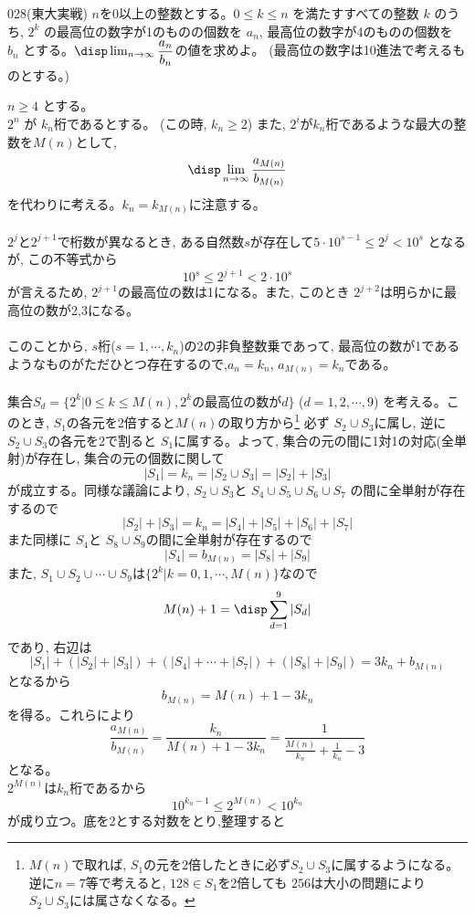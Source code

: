 \begin{prob}{028}{}{(東大実戦)}
 $n$を0以上の整数とする。$0\leq k\leq n$ を満たすすべての整数 $k$ のうち, $2^k$ の最高位の数字が1のものの個数を $a_n$, 最高位の数字が4のものの個数を $b_n$ とする。$\disp\lim_{n\to \infty} \dfrac{a_n}{b_n}$の値を求めよ。 (最高位の数字は10進法で考えるものとする。)
\end{prob}
$n\geq 4$ とする。\\
$2^n$ が $k_n$桁であるとする。 (この時, $k_n\geq 2$) また,  $2^i$が$k_n$桁であるような最大の整数を$M(n)$として,
\[\disp\lim_{n\to \infty} \dfrac{a_{M(n)}}{b_{M(n)}}\]
を代わりに考える。$k_n=k_{M(n)}$に注意する。
\\
\\
$2^{j}$と$2^{j+1}$で桁数が異なるとき, ある自然数$s$が存在して$5\cdot 10^{s-1}\leq 2^j< 10^{s}$ となるが, この不等式から
\[10^{s}\leq 2^{j+1}< 2\cdot 10^{s}\] 
が言えるため, $2^{j+1}$の最高位の数は1になる。また, このとき $2^{j+2}$は明らかに最高位の数が2,3になる。\\
\\
このことから, $s$桁($s=1,\cdots, k_n$)の2の非負整数乗であって, 最高位の数が1であるようなものがただひとつ存在するので,$a_n=k_n$,  $a_{M(n)}=k_{n}$である。\\
\\
集合$S_d=\{ 2^{k} | 0\leq k\leq M(n), 2^k\mbox{の最高位の数が$d$}\}$  ($d=1,2,\cdots ,9$) を考える。このとき, $S_1$の各元を2倍すると$M(n)$の取り方から\footnote{$M(n)$で取れば, $S_1$の元を2倍したときに必ず$S_2\cup S_3$に属するようになる。逆に$n=7$等で考えると, $128\in S_1$を2倍しても $256$は大小の問題により $S_2\cup S_3$には属さなくなる。}
必ず $S_2\cup S_3$に属し, 逆に $S_2\cup S_3$の各元を2で割ると $S_1$に属する。よって, 集合の元の間に1対1の対応(全単射)が存在し, 集合の元の個数に関して
\[|S_1|=k_n=|S_2\cup S_3|=|S_2|+|S_3|\]
が成立する。同様な議論により, $S_2\cup S_3$と $S_4\cup S_5\cup S_6 \cup S_7$ の間に全単射が存在するので
\[|S_2|+|S_3|=k_n=|S_4|+|S_5|+|S_6|+|S_7|\]
また同様に $S_4$と $S_8\cup S_9$の間に全単射が存在するので
\[|S_4|=b_{M(n)}=|S_8|+|S_9|\]
また, $S_1\cup S_2\cup \cdots \cup S_9$は$\{2^{k}| k=0,1,\cdots , M(n)\}$なので
\[M(n)+1=\disp\sum_{d=1}^9 |S_d|\]
であり, 右辺は
\[|S_1| +(|S_2|+|S_3|)+(|S_4|+\cdots +|S_7|) +(|S_8|+|S_9|)=3k_n+b_{M(n)}\]
となるから 
\[b_{M(n)}=M(n)+1-3k_{n}\]
を得る。これらにより
\[\dfrac{a_{M(n)}}{b_{M(n)}}=\dfrac{k_n}{M(n)+1-3k_{n}}=\dfrac{1}{\frac{M(n)}{k_n} +\frac{1}{k_n}-3}\]
となる。\\
$2^{M(n)}$は$k_n$桁であるから
\[10^{k_n-1}\leq 2^{M(n)}<10^{k_n}\]
が成り立つ。底を2とする対数をとり,整理すると
